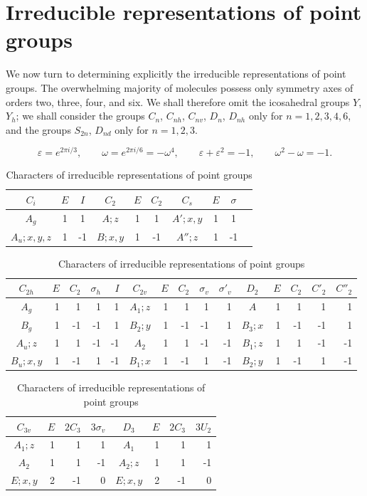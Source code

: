 \section{Irreducible representations of point groups}

We now turn to determining explicitly the irreducible representations of point groups. The overwhelming majority of molecules possess only symmetry axes of orders two, three, four, and six. We shall therefore omit the icosahedral groups $Y$, $Y_h$; we shall consider the groups $C_n$, $C_{nh}$, $C_{nv}$, $D_n$, $D_{nh}$ only for $n=1,2,3,4,6$, and the groups $S_{2n}$, $D_{nd}$ only for $n=1,2,3$.


\[
\varepsilon=e^{2\pi i/3},\qquad \omega=e^{2\pi i/6}=-\omega^4,
\qquad \varepsilon+\varepsilon^2=-1,\qquad \omega^2-\omega=-1.
\]

\begin{table}[p]
\centering\small
\caption{Characters of irreducible representations of point groups}
\begin{tabular}{c|cc|c|cc|c|ccc}
$C_i$&$E$&$I$&$C_2$&$E$&$C_2$&$C_s$&$E$&$\sigma$\\\hline
$A_g$&1&1&$A;z$&1&1&$A';x,y$&1&1\\
$A_u;x,y,z$&1&-1&$B;x,y$&1&-1&$A'';z$&1&-1
\end{tabular}

\medskip
{\setlength{\tabcolsep}{5.8pt}%
\begin{tabular}{c|rrrr|c|rrrr|c|rrrr}
$C_{2h}$&$E$&$C_2$&$\sigma_h$&$I$&$C_{2v}$&$E$&$C_2$&$\sigma_v$&$\sigma'_v$&$D_2$&$E$&$C_2$&$C'_2$&$C''_2$\\\hline
$A_g$&1&1&1&1&$A_1;z$&1&1&1&1&$A$&1&1&1&1\\
$B_g$&1&-1&-1&1&$B_2;y$&1&-1&-1&1&$B_3;x$&1&-1&-1&1\\
$A_u;z$&1&1&-1&-1&$A_2$&1&1&-1&-1&$B_1;z$&1&1&-1&-1\\
$B_u;x,y$&1&-1&1&-1&$B_1;x$&1&-1&1&-1&$B_2;y$&1&-1&1&-1
\end{tabular}
}

\medskip
\begin{tabular}{c|rrr|c|rrr}
$C_{3v}$&$E$&$2C_3$&$3\sigma_v$&$D_3$&$E$&$2C_3$&$3U_2$\\\hline
$A_1;z$&1&1&1&$A_1$&1&1&1\\
$A_2$&1&1&-1&$A_2;z$&1&1&-1\\
$E;x,y$&2&-1&0&$E;x,y$&2&-1&0
\end{tabular}
\end{table}

